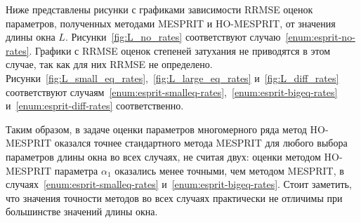 \documentclass[specialist,
  substylefile = spbu.rtx,
subf,href,colorlinks=true, 12pt]{disser}
\theoremstyle{plain}
\theoremstyle{definition}
\theoremstyle{remark}
\begin{document}
Ниже представлены рисунки с графиками зависимости RRMSE оценок параметров,
полученных методами MESPRIT и HO-MESPRIT, от значения длины окна $L$.
Рисунки~\ref{fig:L_no_rates} соответствуют
случаю~\ref{enum:esprit-no-rates}.
Графики с RRMSE оценок степеней затухания не приводятся в этом
случае, так как для них RRMSE не определено.
Рисунки~\ref{fig:L_small_eq_rates},~\ref{fig:L_large_eq_rates}
и~\ref{fig:L_diff_rates}
соответствуют
случаям~\ref{enum:esprit-smalleq-rates},~\ref{enum:esprit-bigeq-rates}
и~\ref{enum:esprit-diff-rates}
соответственно.

Таким образом, в задаче оценки параметров многомерного ряда метод
HO-\linebreak{}MESPRIT оказался точнее стандартного метода MESPRIT для любого
выбора параметров длины окна во всех случаях,
не считая двух: оценки методом HO-MESPRIT параметра $\alpha_1$ оказались
менее точными, чем методом MESPRIT, в
случаях~\ref{enum:esprit-smalleq-rates}
и~\ref{enum:esprit-bigeq-rates}.
Стоит заметить, что значения точности методов во всех случаях практически
не отличимы при большинстве значений длины окна.
\end{document}
